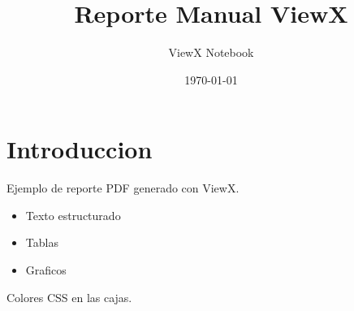 \documentclass{article}%
\title{Reporte Manual ViewX}%
\author{ViewX Notebook}%
\date{\today}%
\begin{document}
%
\normalsize%
\pgfplotsset{compat=1.18}%
\maketitle%
\section{Introduccion}%
\label{sec:Introduccion}%
Ejemplo de reporte PDF generado con ViewX.%
\begin{itemize}%
\item%
Texto estructurado%
\item%
Tablas%
\item%
Graficos%
\end{itemize}%

\begin{tcolorbox}[
    colback=vxbox1,
    colframe=black,
    title=Nota
]
Colores CSS en las cajas.
\end{tcolorbox}

%
\end{document}

